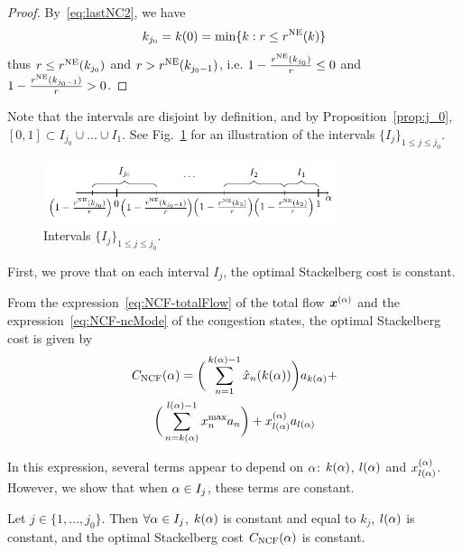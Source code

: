 \begin{proof}
By~\eqref{eq:lastNC2}, we have
\[
k_{j_0} = k(0) = \min \{k : r \leq r^{\textup{NE}} ( k )\}
\]
thus $r \leq r^{\textup{NE}} ( k_{j_0} )$ and $r > r^{\textup{NE}} ( k_{j_0 - 1} )$, i.e.
$1 - \frac{r^{\textup{NE}} ( k_{j_0} )}{r} \leq 0$ and $1 - \frac{r^{\textup{NE}} ( k_{j_0 - 1} )}{r} > 0$.

\end{proof}

Note that the intervals are disjoint by definition, and by Proposition~\ref{prop:j_0}, ${ [0, 1] \subset I_{j_0} \cup \dots \cup I_1 }$. See Fig.~\ref{fig:intervals} for an illustration of the intervals $\{ I_j \}_{1 \leq j \leq j_0}$.

\begin{figure}[h]
\centering
\includegraphics[width=3.4in]{TikZ/intervals.pdf}
\caption{Intervals $\{ I_j \}_{1 \leq j \leq j_0}$.}
\label{fig:intervals}
\end{figure}

First, we prove that on each interval $I_j$, the optimal Stackelberg cost is constant. 

From the expression~\eqref{eq:NCF-totalFlow} of the total flow $\boldsymbol {x}^{(\alpha)}$ and the expression~\eqref{eq:NCF-ncMode} of the congestion states, the optimal Stackelberg cost is given by
\begin{multline}
C_{\textup{NCF}}(\alpha) = 
\bigg( \sum_{n = 1}^{k(\alpha) - 1} \hat{x}_{n} ( k(\alpha) ) \bigg) a_{k(\alpha)} + \\
\bigg( \sum_{n = k(\alpha)}^{l(\alpha) - 1} x^{\max}_n a_n\bigg) + 
x^{(\alpha)}_{l(\alpha)} a_{l(\alpha)}
\label{eq:cost}
\end{multline}

In this expression, several terms appear to depend on $\alpha$: $k(\alpha)$, $l(\alpha)$ and $x^{(\alpha)}_{l(\alpha)}$. However, we show that when $\alpha \in I_j$, these terms are constant.
%


\begin{lemma}
\label{lem:cost}
Let $j \in \{1, \dots, j_0 \}$. Then $\forall \alpha \in I_j$, $k(\alpha)$ is constant and equal to $k_j$, $l(\alpha)$ is constant, and the optimal Stackelberg cost $C_{\textup{NCF}}(\alpha)$ is constant.
\end{lemma}

